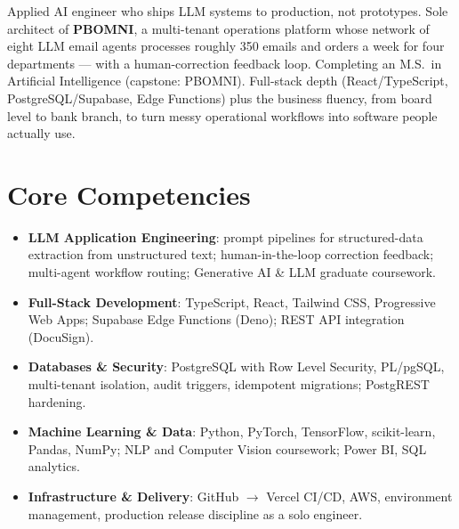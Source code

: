 \documentclass[11pt,letterpaper,sans]{moderncv}
\begin{document}
\makecvtitle


\vspace{6pt}
\small{Applied AI engineer who ships LLM systems to production, not prototypes. Sole architect of \textbf{PBOMNI}, a multi-tenant operations platform whose network of eight LLM email agents processes roughly 350 emails and orders a week for four departments --- with a human-correction feedback loop. Completing an M.S.\ in Artificial Intelligence (capstone: PBOMNI). Full-stack depth (React/TypeScript, PostgreSQL/Supabase, Edge Functions) plus the business fluency, from board level to bank branch, to turn messy operational workflows into software people actually use.}


\section{Core Competencies}
\vspace{1pt}
\begin{itemize}

\item \textbf{LLM Application Engineering}: prompt pipelines for structured-data extraction from unstructured text; human-in-the-loop correction feedback; multi-agent workflow routing; Generative AI \& LLM graduate coursework.

\item \textbf{Full-Stack Development}: TypeScript, React, Tailwind CSS, Progressive Web Apps; Supabase Edge Functions (Deno); REST API integration (DocuSign).

\item \textbf{Databases \& Security}: PostgreSQL with Row Level Security, PL/pgSQL, multi-tenant isolation, audit triggers, idempotent migrations; PostgREST hardening.

\item \textbf{Machine Learning \& Data}: Python, PyTorch, TensorFlow, scikit-learn, Pandas, NumPy; NLP and Computer Vision coursework; Power BI, SQL analytics.

\item \textbf{Infrastructure \& Delivery}: GitHub $\rightarrow$ Vercel CI/CD, AWS, environment management, production release discipline as a solo engineer.

\end{itemize}
\end{document}
